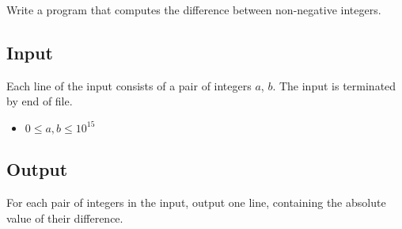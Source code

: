 
Write a program that computes the difference between non-negative integers.

\subsection*{Input}

Each line of the input consists of a pair of integers $a$, $b$.
The input is terminated by end of file.

\begin{itemize}
    \item $0 \leq a, b \leq 10^{15}$
\end{itemize}

\subsection*{Output}

For each pair of integers in the input, output one line, containing the absolute value of their difference.
